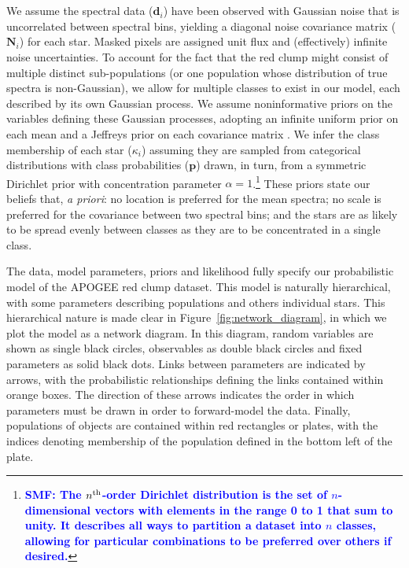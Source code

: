 \documentclass[a4paper,fleqn,usenatbib]{mnras}
\newcommand{\classprobs}{{\bm p}}
\newcommand{\objclass}{{\kappa}}
\newcommand{\objdata}{\hat{\bm d}}
\newcommand{\objnoise}{{\bm N}}
\newcommand{\smf}[1]{\textbf{\textcolor{blue}{SMF: #1}}}
\begin{document}
We assume the spectral data ($\objdata_i$) have been observed with Gaussian noise that is uncorrelated between spectral bins, yielding a diagonal noise covariance matrix ($\objnoise_i$) for each star. Masked pixels are assigned unit flux and (effectively) infinite noise uncertainties. To account for the fact that the red clump might consist of multiple distinct sub-populations (or one population whose distribution of true spectra is non-Gaussian), we allow for multiple classes to exist in our model, each described by its own Gaussian process. We assume noninformative priors on the variables defining these Gaussian processes, adopting an infinite uniform prior on each mean and a Jeffreys prior on each covariance matrix \citep[p73]{Gelman_etal:2013}. We infer the class membership of each star ($\objclass_i$) assuming they are sampled from categorical distributions with class probabilities ($\classprobs$) drawn, in turn, from a symmetric Dirichlet prior with concentration parameter $\alpha=1$.\footnote{\smf{The $n^{\rm th}$-order Dirichlet distribution is the set of $n$-dimensional vectors with elements in the range 0 to 1 that sum to unity. It describes all ways to partition a dataset into $n$ classes, allowing for particular combinations to be preferred over others if desired.}} These priors state our beliefs that, {\it a priori}: no location is preferred for the mean spectra; no scale is preferred for the covariance between two spectral bins; and the stars are as likely to be spread evenly between classes as they are to be concentrated in a single class.

The data, model parameters, priors and likelihood fully specify our probabilistic model of the APOGEE red clump dataset. This model is naturally hierarchical, with some parameters describing populations and others individual stars. This hierarchical nature is made clear in Figure~\ref{fig:network_diagram}, in which we plot the model as a network diagram. In this diagram, random variables are shown as single black circles, observables as double black circles and fixed parameters as solid black dots. Links between parameters are indicated by arrows, with the probabilistic relationships defining the links contained within orange boxes. The direction of these arrows indicates the order in which parameters must be drawn in order to forward-model the data. Finally, populations of objects are contained within red rectangles or plates, with the indices denoting membership of the population defined in the bottom left of the plate.
\end{document}
